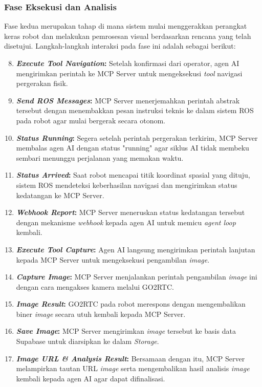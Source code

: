 \subsubsection{Fase Eksekusi dan Analisis}

Fase kedua merupakan tahap di mana sistem mulai menggerakkan perangkat keras robot dan melakukan pemrosesan visual berdasarkan rencana yang telah disetujui. Langkah-langkah interaksi pada fase ini adalah sebagai berikut:

\begin{enumerate}
    \setcounter{enumi}{7}
    \item \textbf{\textit{Execute Tool Navigation}:} Setelah konfirmasi dari operator, agen AI mengirimkan perintah ke MCP Server untuk mengeksekusi \textit{tool} navigasi pergerakan fisik.
    \item \textbf{\textit{Send ROS Messages}:} MCP Server menerjemahkan perintah abstrak tersebut dengan menembakkan pesan instruksi teknis ke dalam sistem ROS pada robot agar mulai bergerak secara otonom.
    \item \textbf{\textit{Status Running}:} Segera setelah perintah pergerakan terkirim, MCP Server membalas agen AI dengan status "running" agar siklus AI tidak membeku sembari menunggu perjalanan yang memakan waktu.
    \item \textbf{\textit{Status Arrived}:} Saat robot mencapai titik koordinat spasial yang dituju, sistem ROS mendeteksi keberhasilan navigasi dan mengirimkan status kedatangan ke MCP Server.
    \item \textbf{\textit{Webhook Report}:} MCP Server meneruskan status kedatangan tersebut dengan mekanisme \textit{webhook} kepada agen AI untuk memicu \textit{agent loop} kembali.
    \item \textbf{\textit{Execute Tool Capture}:} Agen AI langsung mengirimkan perintah lanjutan kepada MCP Server untuk mengeksekusi pengambilan \textit{image}.
    \item \textbf{\textit{Capture Image}:} MCP Server menjalankan perintah pengambilan \textit{image} ini dengan cara mengakses kamera melalui GO2RTC.
    \item \textbf{\textit{Image Result}:} GO2RTC pada robot merespons dengan mengembalikan biner \textit{image} secara utuh kembali kepada MCP Server.
    \item \textbf{\textit{Save Image}:} MCP Server mengirimkan \textit{image} tersebut ke basis data Supabase untuk diarsipkan ke dalam \textit{Storage}.
    \item \textbf{\textit{Image URL \& Analysis Result}:} Bersamaan dengan itu, MCP Server melampirkan tautan URL \textit{image} serta mengembalikan hasil analisis \textit{image} kembali kepada agen AI agar dapat difinalisasi.
\end{enumerate}

